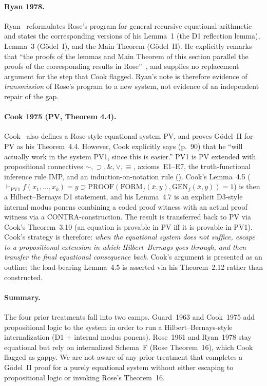 \documentclass[11pt]{article}
\begin{document}
\paragraph{Ryan 1978.}
Ryan~\cite{ryan1978} reformulates Rose's program for general
recursive equational arithmetic and states the corresponding
versions of his Lemma~1 (the D1 reflection lemma), Lemma~3
(G\"odel~I), and the Main Theorem (G\"odel~II).  He
explicitly remarks that ``the proofs of the lemmas and Main
Theorem of this section parallel the proofs of the
corresponding results in Rose''~\cite{ryan1978}, and supplies
no replacement argument for the step that Cook flagged.
Ryan's note is therefore evidence of \emph{transmission} of
Rose's program to a new system, not evidence of an
independent repair of the gap.

\paragraph{Cook 1975 (PV, Theorem 4.4).}
Cook~\cite{cook1975} also defines a Rose-style equational
system PV, and proves G\"odel~II for PV as his Theorem~4.4.
However, Cook explicitly says (p.~90) that he ``will
actually work in the system PV1, since this is easier.''
PV1 is PV extended with propositional connectives
$\sim, \supset, \&, \vee, \equiv$, axioms~E1--E7, the
truth-functional inference rule IMP, and an
induction-on-notation rule (\cite[Section~3]{cook1975}).
Cook's Lemma~4.5 ($\vdash_{\mathrm{PV1}} f(x_1,\dots,x_k) = y
\supset \mathrm{PROOF}(\mathrm{FORM}_f(\bar x, y),
\mathrm{GEN}_f(\bar x, y)) = 1$) is then a Hilbert--Bernays
D1 statement, and his Lemma~4.7 is an explicit D3-style
internal modus ponens combining a coded proof witness with
an actual proof witness via a CONTRA-construction.  The result
is transferred back to PV via Cook's Theorem~3.10 (an equation
is provable in PV iff it is provable in PV1).  Cook's
strategy is therefore: \emph{when the equational system does
not suffice, escape to a propositional extension in which
Hilbert--Bernays goes through, and then transfer the final
equational consequence back}.  Cook's argument is presented
as an outline; the load-bearing Lemma~4.5 is asserted via
his Theorem~2.12 rather than constructed.

\paragraph{Summary.}
The four prior treatments fall into two camps.
Guard~1963 and Cook~1975 add propositional logic to the
system in order to run a Hilbert--Bernays-style internalization
(D1 + internal modus ponens).  Rose~1961 and Ryan~1978 stay
equational but rely on internalized Schema~F (Rose Theorem~16),
which Cook flagged as gappy.  We are not aware of any prior
treatment that completes a G\"odel~II proof for a purely
equational system without either escaping to propositional
logic or invoking Rose's Theorem~16.
\end{document}
